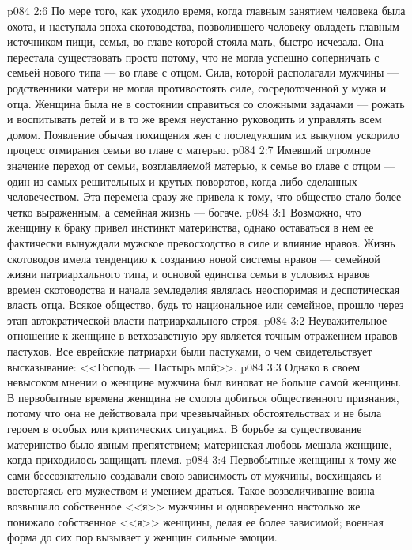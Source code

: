 \vs p084 2:6 По мере того, как уходило время, когда главным занятием человека была охота, и наступала эпоха скотоводства, позволившего человеку овладеть главным источником пищи, семья, во главе которой стояла мать, быстро исчезала. Она перестала существовать просто потому, что не могла успешно соперничать с семьей нового типа --- во главе с отцом. Сила, которой располагали мужчины --- родственники матери не могла противостоять силе, сосредоточенной у мужа и отца. Женщина была не в состоянии справиться со сложными задачами --- рожать и воспитывать детей и в то же время неустанно руководить и управлять всем домом. Появление обычая похищения жен с последующим их выкупом ускорило процесс отмирания семьи во главе с матерью.
\vs p084 2:7 Имевший огромное значение переход от семьи, возглавляемой матерью, к семье во главе с отцом --- один из самых решительных и крутых поворотов, когда\hyp{}либо сделанных человечеством. Эта перемена сразу же привела к тому, что общество стало более четко выраженным, а семейная жизнь --- богаче.
\vs p084 3:1 Возможно, что женщину к браку привел инстинкт материнства, однако оставаться в нем ее фактически вынуждали мужское превосходство в силе и влияние нравов. Жизнь скотоводов имела тенденцию к созданию новой системы нравов --- семейной жизни патриархального типа, и основой единства семьи в условиях нравов времен скотоводства и начала земледелия являлась неоспоримая и деспотическая власть отца. Всякое общество, будь то национальное или семейное, прошло через этап автократической власти патриархального строя.
\vs p084 3:2 Неуважительное отношение к женщине в ветхозаветную эру является точным отражением нравов пастухов. Все еврейские патриархи были пастухами, о чем свидетельствует высказывание: <<Господь --- Пастырь мой>>.
\vs p084 3:3 Однако в своем невысоком мнении о женщине мужчина был виноват не больше самой женщины. В первобытные времена женщина не смогла добиться общественного признания, потому что она не действовала при чрезвычайных обстоятельствах и не была героем в особых или критических ситуациях. В борьбе за существование материнство было явным препятствием; материнская любовь мешала женщине, когда приходилось защищать племя.
\vs p084 3:4 Первобытные женщины к тому же сами бессознательно создавали свою зависимость от мужчины, восхищаясь и восторгаясь его мужеством и умением драться. Такое возвеличивание воина возвышало собственное <<я>> мужчины и одновременно настолько же понижало собственное <<я>> женщины, делая ее более зависимой; военная форма до сих пор вызывает у женщин сильные эмоции.
